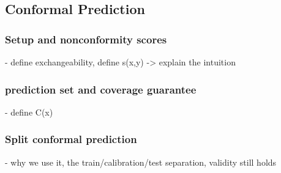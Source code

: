 \subsection{Conformal Prediction}
\label{sec2.4: conformal prediction}

\subsubsection{Setup and nonconformity scores}
\noindent - define exchangeability, define s(x,y) -> explain the intuition

\subsubsection{prediction set and coverage guarantee} \noindent - define C(x) 

\subsubsection{Split conformal prediction} 
\noindent - why we use it, the train/calibration/test separation, validity still holds

